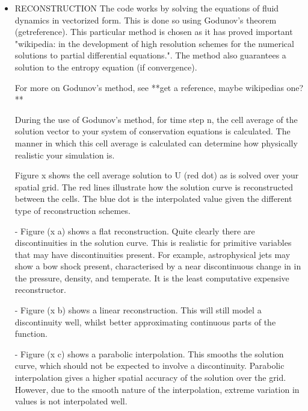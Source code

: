 \documentclass[12pt,a4paper]{report}
\begin{document}
\begin{itemize}
\item RECONSTRUCTION
The code works by solving the equations of fluid dynamics in vectorized form. This is done so using Godunov's theorem (getreference). This particular method is chosen as it has proved important "wikipedia: in the  development of high resolution schemes for the numerical solutions to partial differential equations.". 
The method also guarantees a solution to the entropy equation (if convergence).

For more on Godunov's method, see **get a reference, maybe wikipedias one?**

During the use of Godunov's method, for time step n, the cell average of the solution vector to your system of conservation equations is calculated. The manner in which this cell average is calculated can determine how physically realistic your simulation is.

Figure x shows the cell average solution to U (red dot) as is solved over your spatial grid. The red lines illustrate how the solution curve is reconstructed between the cells. The blue dot is the interpolated value given the different type of reconstruction schemes.

\subitem - Figure (x a) shows a flat reconstruction. Quite clearly there are discontinuities in the solution curve. This is realistic for primitive variables that may have discontinuities present. For example, astrophysical jets may show a bow shock present, characterised by a near discontinuous change in in the pressure, density, and temperate. It is the least computative expensive reconstructor.

\subitem - Figure (x b) shows a linear reconstruction. This will still model a discontinuity well, whilst better approximating continuous parts of the function.

\subitem - Figure (x c) shows a parabolic interpolation. 
This smooths the solution curve, which should not be expected to involve a discontinuity. Parabolic interpolation gives a higher spatial accuracy of the solution over the grid. However, due to the smooth nature of the interpolation, extreme variation in values is not interpolated well.


\end{itemize}
\end{document}
